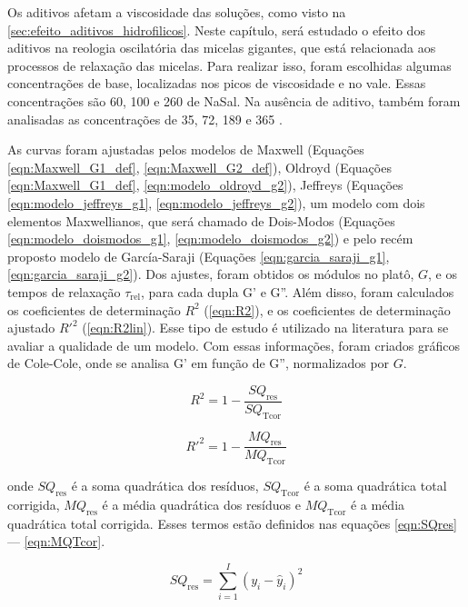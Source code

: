 		Os aditivos afetam a viscosidade das soluções, como visto na \autoref{sec:efeito_aditivos_hidrofilicos}. Neste capítulo, será estudado o efeito dos aditivos na reologia oscilatória das micelas gigantes, que está relacionada aos processos de relaxação das micelas. Para realizar isso, foram escolhidas algumas concentrações de base, localizadas nos picos de viscosidade e no vale. Essas concentrações são 60, 100 e 260\mM{} de NaSal. Na ausência de aditivo, também foram analisadas as concentrações de 35, 72, 189 e 365 \mM.
		
		As curvas foram ajustadas pelos modelos de Maxwell (Equações \ref{eqn:Maxwell_G1_def}, \ref{eqn:Maxwell_G2_def}), Oldroyd (Equações \ref{eqn:Maxwell_G1_def}, \ref{eqn:modelo_oldroyd_g2}), Jeffreys (Equações \ref{eqn:modelo_jeffreys_g1}, \ref{eqn:modelo_jeffreys_g2}), um modelo com dois elementos Maxwellianos, que será chamado de Dois-Modos (Equações \ref{eqn:modelo_doismodos_g1}, \ref{eqn:modelo_doismodos_g2}) e pelo recém proposto modelo de García-Saraji (Equações \ref{eqn:garcia_saraji_g1}, \ref{eqn:garcia_saraji_g2}). Dos ajustes, foram obtidos os módulos no platô, \(G\), e os tempos de relaxação \(\tau_\mathrm{rel}\), para cada dupla G' e G''. Além disso, foram calculados os coeficientes de determinação \(R^2\) (\autoref{eqn:R2}), e os coeficientes de determinação ajustado \(R\mathrm{'}^{2}\) (\autoref{eqn:R2lin}). Esse tipo de estudo é utilizado na literatura para se avaliar a qualidade de um modelo. %
		Com essas informações, foram criados gráficos de Cole-Cole, onde se analisa G' em função de G'', normalizados por \(G\).
		
		\begin{equation}
			R^2 = 1 - \dfrac{SQ_\mathrm{res}}{SQ_\mathrm{Tcor}}
			\label{eqn:R2}
		\end{equation}
		
		\begin{equation}
			R\mathrm{'}^{2} = 1 - \dfrac{MQ_\mathrm{res}}{MQ_\mathrm{Tcor}}
			\label{eqn:R2lin}
		\end{equation}
		
		\noindent onde \(SQ_\mathrm{res}\) é a soma quadrática dos resíduos, \(SQ_\mathrm{Tcor}\) é a soma quadrática total corrigida, \(MQ_\mathrm{res}\) é a média quadrática dos resíduos e \(MQ_\mathrm{Tcor}\) é a média quadrática total corrigida. Esses termos estão definidos nas equações \ref{eqn:SQres} --- \ref{eqn:MQTcor}.
		
		\begin{equation}
			SQ_\mathrm{res} = \sum_{i=1}^{I} \left( y_i - \hat{y}_i \right) ^ 2
			\label{eqn:SQres}
		\end{equation}
		
